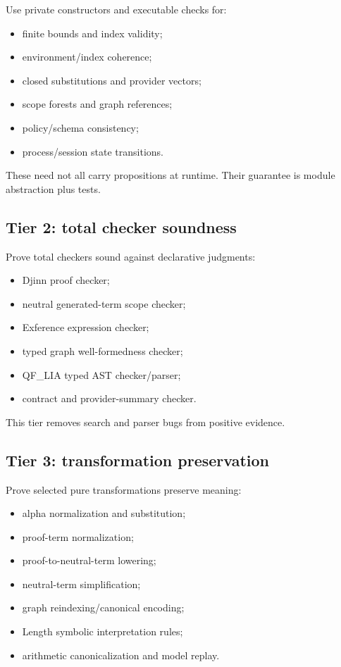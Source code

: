 \documentclass[10pt,letterpaper,oneside]{report}
\begin{document}
Use private constructors and executable checks for:

\begin{itemize}
  \item finite bounds and index validity;
  \item environment/index coherence;
  \item closed substitutions and provider vectors;
  \item scope forests and graph references;
  \item policy/schema consistency;
  \item process/session state transitions.
\end{itemize}

These need not all carry propositions at runtime. Their guarantee is module abstraction plus tests.

\subsection{Tier 2: total checker soundness}

Prove total checkers sound against declarative judgments:

\begin{itemize}
  \item Djinn proof checker;
  \item neutral generated-term scope checker;
  \item Exference expression checker;
  \item typed graph well-formedness checker;
  \item QF\_LIA typed AST checker/parser;
  \item contract and provider-summary checker.
\end{itemize}

This tier removes search and parser bugs from positive evidence.

\subsection{Tier 3: transformation preservation}

Prove selected pure transformations preserve meaning:

\begin{itemize}
  \item alpha normalization and substitution;
  \item proof-term normalization;
  \item proof-to-neutral-term lowering;
  \item neutral-term simplification;
  \item graph reindexing/canonical encoding;
  \item Length symbolic interpretation rules;
  \item arithmetic canonicalization and model replay.
\end{itemize}
\end{document}
